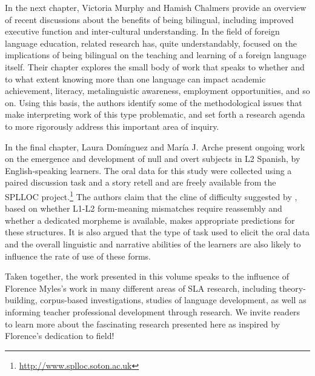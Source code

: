 \documentclass[output=paper]{langscibook}
\begin{document}
\begin{sloppypar}
In the next chapter, Victoria Murphy and Hamish Chalmers provide an overview of recent discussions about the benefits of being bilingual, including improved executive function and inter-cultural understanding. In the field of foreign language education, related research has, quite understandably, focused on the implications of being bilingual on the teaching and learning of a foreign language itself. Their chapter explores the small body of work that speaks to whether and to what extent knowing more than one language can impact academic achievement, literacy, metalinguistic awareness, employment opportunities, and so on. Using this basis, the authors identify some of the methodological issues that make interpreting work of this type problematic, and set forth a research agenda to more rigorously address this important area of inquiry.
\end{sloppypar}

In the final chapter, Laura Domínguez and María J. Arche present ongoing work on the emergence and development of null and overt subjects in L2 Spanish, by English-speaking learners. The oral data for this study were collected using a paired discussion task and a story retell and are freely available from the SPLLOC project.\footnote{\url{http://www.splloc.soton.ac.uk}} The authors claim that the cline of difficulty suggested by \citet{ChoSlabakova2014}, based on whether L1-L2 form-meaning mismatches require reassembly and whether a dedicated morpheme is available, makes appropriate predictions for these structures. It is also argued that the type of task used to elicit the oral data and the overall linguistic and narrative abilities of the learners are also likely to influence the rate of use of these forms.

Taken together, the work presented in this volume speaks to the influence of Florence Myles’s work in many different areas of SLA research, including theory-building, corpus-based investigations, studies of language development, as well as informing teacher professional development through research. We invite readers to learn more about the fascinating research presented here as inspired by Florence’s dedication to field!

\printbibliography[heading=subbibliography,notkeyword=this]
\end{document}
